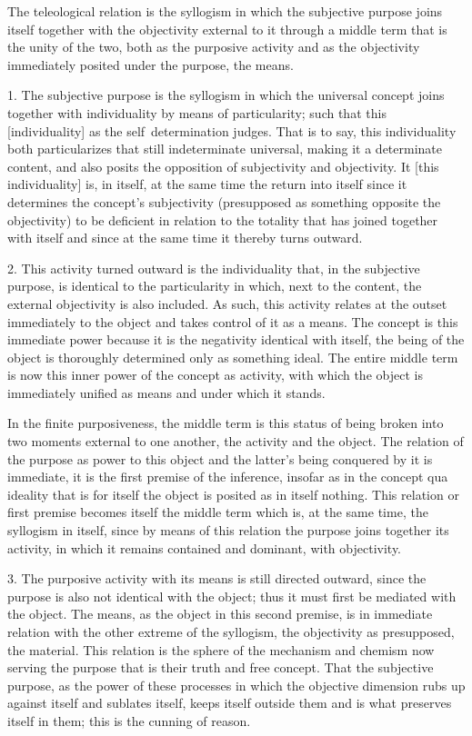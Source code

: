 The teleological relation is the syllogism
in which the subjective purpose joins itself
together with the objectivity external to it
through a middle term that is the unity of the two,
both as the purposive activity and as the objectivity
immediately posited under the purpose, the means.

1. The subjective purpose is the syllogism in which the universal concept
joins together with individuality by means of particularity;
such that this [individuality] as the self~determination judges.
That is to say, this individuality both particularizes that still indeterminate universal,
making it a determinate content, and also posits the opposition of subjectivity and objectivity.
It [this individuality] is, in itself, at the same time the return
into itself since it determines the concept's subjectivity
(presupposed as something opposite the objectivity)
to be deficient in relation to the totality that has joined together
with itself and since at the same time it thereby turns outward.

2. This activity turned outward is the individuality that,
in the subjective purpose, is identical to the particularity
in which, next to the content, the external objectivity is also included.
As such, this activity relates at the outset immediately to the object and
takes control of it as a means.
The concept is this immediate power because it is
the negativity identical with itself,
the being of the object is thoroughly determined only as something ideal.
The entire middle term is now this inner power of the concept as activity,
with which the object is immediately unified as means and under which it stands.

In the finite purposiveness, the middle term is this status of
being broken into two moments external to one another,
the activity and the object.
The relation of the purpose as power to this object and
the latter's being conquered by it is immediate,
it is the first premise of the inference,
insofar as in the concept qua ideality that is for itself
the object is posited as in itself nothing.
This relation or first premise becomes itself the middle term
which is, at the same time, the syllogism in itself,
since by means of this relation the purpose joins together its activity,
in which it remains contained and dominant, with objectivity.

3. The purposive activity with its means is still directed outward,
since the purpose is also not identical with the object;
thus it must first be mediated with the object.
The means, as the object in this second premise, is in
immediate relation with the other extreme of the syllogism,
the objectivity as presupposed, the material.
This relation is the sphere of the mechanism and chemism
now serving the purpose that is their truth and free concept.
That the subjective purpose, as the power of these processes in which the
objective dimension rubs up against itself and sublates itself,
keeps itself outside them and is what preserves itself in them;
this is the cunning of reason.

